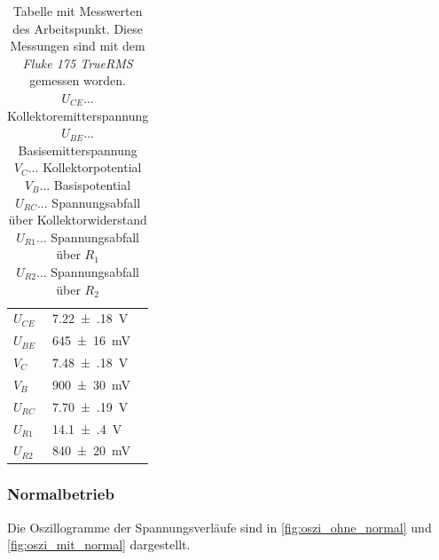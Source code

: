 \documentclass[12pt,english,ngerman]{scrartcl}
\begin{document}
\begin{table}[H]
  \caption{Tabelle mit Messwerten des Arbeitspunkt. Diese Messungen sind
  mit dem \textit{Fluke 175 TrueRMS} gemessen worden. \\
  $U_{CE} \dots$ Kollektoremitterspannung \\
  $U_{BE} \dots$ Basisemitterspannung \\
  $V_C \dots$  Kollektorpotential \\ 
  $V_B \dots$  Basispotential \\ 
  $U_{RC} \dots$ Spannungsabfall über Kollektorwiderstand  \\ 
  $U_{R1} \dots$ Spannungsabfall über $R_1$ \\
  $U_{R2} \dots$ Spannungsabfall über $R_2$
}
  \label{tab:messugenarbeitspunkt}
  \centering
  \begin{tabular}[c]{l|l}
    $U_{CE}$ &  \SI{7.22(18)}{\volt} \\
    $U_{BE}$ &  \SI{645(16)}{\milli\volt} \\
    $V_C$    &  \SI{7.48(18)}{\volt} \\
    $V_B$    &  \SI{900(30)}{\milli\volt} \\
    $U_{RC}$ &  \SI{7.70(19)}{\volt} \\
    $U_{R1}$ &  \SI{14.1(4)}{\volt} \\
    $U_{R2}$ &  \SI{840(20)}{\milli\volt}
  \end{tabular}
\end{table}



\subsubsection{Normalbetrieb}

Die Oszillogramme der Spannungsverläufe sind in \autoref{fig:oszi_ohne_normal}
und \autoref{fig:oszi_mit_normal} dargestellt. 
\end{document}

